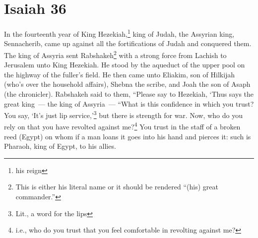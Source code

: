 \section{Isaiah 36}\label{Isaiah 36}
\begin{enumerate}[align=center]
     In the fourteenth year of King Hezekiah,\footnote{his reign} king of Judah, the Assyrian king, Sennacherib, came up against all the fortifications of Judah and conquered them.%
     The king of Assyria sent Rabshakeh\footnote{This is either his literal name or it should be rendered ``(his) great commander.''} with a strong force from Lachish to Jerusalem unto King Hezekiah. He stood by the aqueduct of the upper pool on the highway of the fuller's field.%
     He then came unto Eliakim, son of Hilkijah (who's over the household affairs), Shebna the scribe, and Joah the son of Asaph (the chronicler).%
     Rabshakeh said to them, ``Please say to Hezekiah, `Thus says the great king~--- the king of Assyria~--- ``What is this confidence in which you trust?%
     You say, `It's just lip service,'\footnote{Lit., a word for the lips} but there is strength for war. Now, who do you rely on that you have revolted against me?\footnote{i.e., who do you trust that you feel comfortable in revolting against me?}%
     You trust in the staff of a broken reed (Egypt) on whom if a man loans it goes into his hand and pierces it: such is Pharaoh, king of Egypt, to his allies.%
\end{enumerate}
